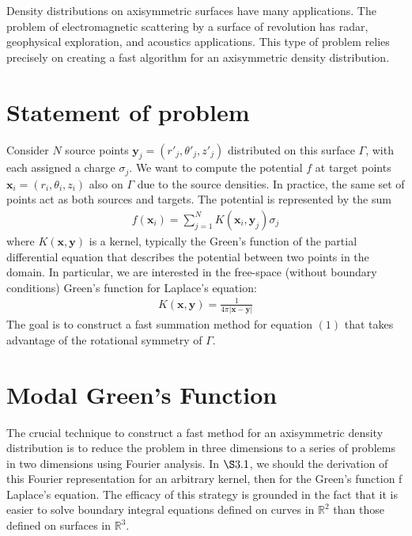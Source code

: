 \documentclass[11pt, oneside]{article}   	%
\begin{document}
Density distributions on axisymmetric surfaces have many applications. The problem of electromagnetic scattering by a surface of revolution has radar, geophysical exploration, and acoustics applications. This type of problem relies precisely on creating a fast algorithm for an axisymmetric density distribution.

\section{Statement of problem}
Consider $N$ source points $\mathbf{y}_j=(r'_j,\theta'_j,z'_j)$ distributed on this surface $\Gamma$, with each assigned a charge $\sigma_j$. We want to compute the potential $f$ at target points $\mathbf{x}_i=(r_i,\theta_i,z_i)$ also on $\Gamma$ due to the source densities.  In practice, the same set of points act as both sources and targets. The potential is represented by the sum
\begin{align}
f(\mathbf{x}_i) = \sum_{j=1}^N K(\mathbf{x}_i,\mathbf{y}_j)\sigma_j
\end{align}
where $K(\mathbf{x},\mathbf{y})$ is a kernel, typically the Green's function of the partial differential equation that describes the potential between two points in the domain. In particular, we are interested in the free-space (without boundary conditions) Green's function for Laplace's equation:
\begin{align}
K(\mathbf{x},\mathbf{y}) = \frac{1}{4\pi |\mathbf{x}-\mathbf{y}|}
\end{align}
The goal is to construct a fast summation method for equation $(1)$ that takes advantage of the rotational symmetry of $\Gamma$.

\section{Modal Green's Function}

The crucial technique to construct a fast method for an axisymmetric density distribution is to reduce the problem in three dimensions to a series of problems in two dimensions using Fourier analysis. In $\S3.1$, we should the derivation of this Fourier representation for an arbitrary kernel, then for the Green's function f Laplace's equation. The efficacy of this strategy is grounded in the fact that it is easier to solve boundary integral equations defined on curves in $\mathbb{R}^2$ than those defined on surfaces in $\mathbb{R}^3$.
\end{document}
